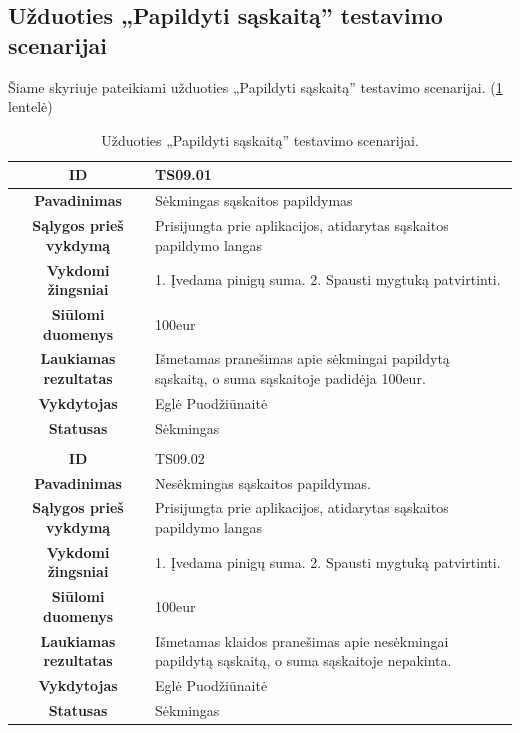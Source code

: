 \documentclass{VUMIFPSkursinis}
\begin{document}
	\subsection{Užduoties „Papildyti sąskaitą” testavimo scenarijai}
	Šiame skyriuje pateikiami užduoties „Papildyti sąskaitą” testavimo scenarijai. (\ref{papildymas} lentelė)
	\begin{table}[H]
		\caption{Užduoties „Papildyti sąskaitą” testavimo scenarijai.}
		\begin{tabular}{|p{6cm}|p{11cm}|}
			\hline
			\multicolumn{1}{|c|}{{\bfseries ID}}&
			{TS09.01}\\
			\hline
			\multicolumn{1}{|c|}{{\bfseries Pavadinimas}}&
			{Sėkmingas sąskaitos papildymas}\\
			\hline
			\multicolumn{1}{|c|}{{\bfseries Sąlygos prieš vykdymą}}&
			{Prisijungta prie aplikacijos, atidarytas sąskaitos papildymo langas}\\
			\hline
			\multicolumn{1}{|c|}{{\bfseries Vykdomi žingsniai}}&
			{1. Įvedama pinigų suma.
				2. Spausti mygtuką patvirtinti.}\\
			\hline
			\multicolumn{1}{|c|}{{\bfseries Siūlomi duomenys}}&
			{100eur}\\
			\hline
			\multicolumn{1}{|c|}{{\bfseries Laukiamas rezultatas}}&
			{Išmetamas pranešimas apie sėkmingai papildytą sąskaitą, o suma sąskaitoje padidėja 100eur.}\\
			\hline
			\multicolumn{1}{|c|}{{\bfseries Vykdytojas}}&
			{Eglė Puodžiūnaitė}\\
			\hline
			\multicolumn{1}{|c|}{{\bfseries Statusas}}&
			{Sėkmingas}\\
			\hline
			\rowcolor{lightgray}
			\multicolumn{2}{|c|}{}\\
			\hline				
			\multicolumn{1}{|c|}{{\bfseries ID}}&
			{TS09.02}\\
			\hline
			\multicolumn{1}{|c|}{{\bfseries Pavadinimas}}&
			{Nesėkmingas sąskaitos papildymas.}\\
			\hline
			\multicolumn{1}{|c|}{{\bfseries Sąlygos prieš vykdymą}}&
			{Prisijungta prie aplikacijos, atidarytas sąskaitos papildymo langas}\\
			\hline
			\multicolumn{1}{|c|}{{\bfseries Vykdomi žingsniai}}&
			{1. Įvedama pinigų suma.
				2. Spausti mygtuką patvirtinti.}\\
			\hline
			\multicolumn{1}{|c|}{{\bfseries Siūlomi duomenys}}&
			{100eur}\\
			\hline
			\multicolumn{1}{|c|}{{\bfseries Laukiamas rezultatas}}&
			{Išmetamas klaidos pranešimas apie nesėkmingai papildytą sąskaitą, o suma sąskaitoje nepakinta.}\\
			\hline
			\multicolumn{1}{|c|}{{\bfseries Vykdytojas}}&
			{Eglė Puodžiūnaitė}\\
			\hline
			\multicolumn{1}{|c|}{{\bfseries Statusas}}&
			{Sėkmingas}\\
			\hline		
		\end{tabular}
		\label{papildymas}
	\end{table}	
	
\end{document}
